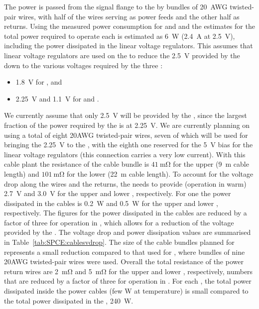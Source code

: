 The  power is passed from the signal flange to the
 by bundles of \SI{20}{AWG} twisted-pair wires, with half of
the wires serving as power feeds and the other half as returns.
Using the measured power consumption for  and 
and the estimates for  the total power required to
operate each  is estimated as \SI{6}{W} (\SI{2.4}{A}
at \SI{2.5}{V}), including the power dissipated in the linear voltage
regulators. This assumes that linear voltage regulators are
used on the  to reduce the \SI{2.5}{V} provided by the
 down to the various voltages required by the three
:
\begin{itemize}
\item \SI{1.8}{V} for , and
\item \SI{2.25}{V} and \SI{1.1}{V} for  and .
\end{itemize}
We currently assume that only \SI{2.5}{V} will be provided by the 
, since the largest fraction of the power required by
the  is at \SI{2.25}{V}. We are currently planning on using 
a total of eight \num{20}AWG twisted-pair wires, seven of which will be used
for bringing the \SI{2.25}{V} to the , with the eighth
one reserved for the \SI{5}{V} bias for the linear voltage regulators
(this connection carries a very low current). With this cable plant the
resistance of the cable bundle is $\SI{41}{\milli\ohm}$ for the upper 
 (\SI{9}{m} cable length) and $\SI{101}{\milli\ohm}$ for
the lower  (\SI{22}{m} cable length). To account for the
voltage drop along the wires and the returns, the  needs to
provide (operation in warm) \SI{2.7}{V} and \SI{3.0}{V} for the upper
and lower , respectively. For one  the power
dissipated in the cables is \SI{0.2}{W} and \SI{0.5}{W} for the upper
and lower , respectively. The figures for the power 
dissipated in the cables are reduced by a factor of three for operation
in , which allows for a reduction of the voltage 
provided by the . The voltage drop and power dissipation
values are summarised in Table~\ref{tab:SPCE:cablesvdrop}.
The size of the cable bundles planned
for  represents a small reduction compared to that used
for , where bundles of nine \num{20}AWG twisted-pair wires
were used. Overall the total resistance of the power return wires
are \SI{2}{\milli\ohm} and \SI{5}{\milli\ohm} for the upper and
lower , respectively, numbers that are reduced by 
a factor of three for operation in . For each , the total power 
dissipated inside the power cables (few W at  temperature)
is small compared to the total power dissipated in the ,
\SI{240}{W}.

